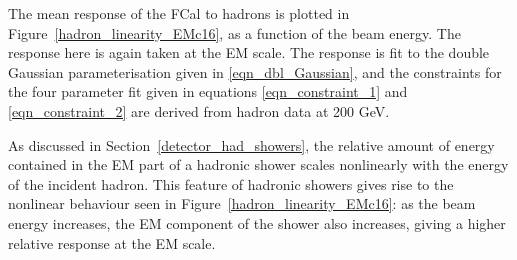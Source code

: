  
 
The mean response of the FCal to hadrons is plotted in Figure~\ref{hadron_linearity_EMc16}, as a function of the beam energy. The response here is again taken at the EM scale. The response is fit to the double Gaussian parameterisation  given in \ref{eqn_dbl_Gaussian}, and the constraints for the four parameter fit given in equations \ref{eqn_constraint_1} and \ref{eqn_constraint_2} are derived from hadron data at 200 GeV.

As discussed in Section~\ref{detector_had_showers}, the relative amount of energy contained in the EM part of a hadronic shower scales nonlinearly with the energy of the incident hadron.  This feature of hadronic showers gives rise to the nonlinear behaviour seen in Figure~\ref{hadron_linearity_EMc16}: as the beam energy increases, the EM component of the shower also increases, giving a higher relative response at the EM scale.


